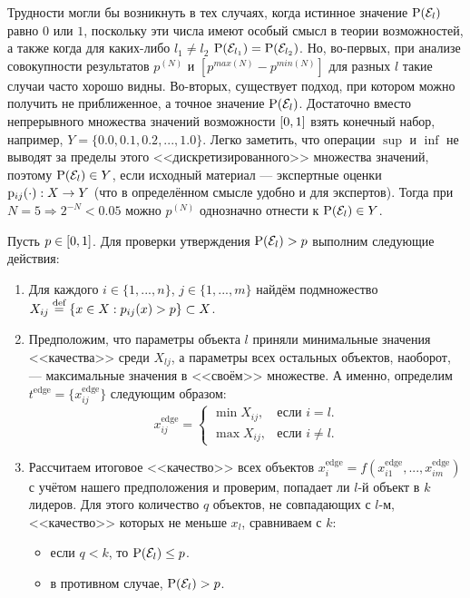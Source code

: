 Трудности могли бы возникнуть в тех случаях, когда истинное значение ${\mathrm{P}}(\mathcal{E}_l)$ равно $0$ или $1$, поскольку эти числа имеют особый смысл в теории возможностей, а также когда для каких-либо $l_1 \neq l_2$ ${\mathrm{P}}(\mathcal{E}_{l_1}) = {\mathrm{P}}(\mathcal{E}_{l_2})$. Но, во-первых, при анализе совокупности результатов $p^{(N)}$ и $[p^{max(N)} - p^{min(N)}]$ для разных $l$ такие случаи часто хорошо видны. Во-вторых, существует подход, при котором можно получить не приближенное, а точное значение ${\mathrm{P}}(\mathcal{E}_l)$. Достаточно вместо непрерывного множества значений возможности $[0,1]$ взять конечный набор, например, $Y = \{0.0, 0.1, 0.2, ..., 1.0\}$. Легко заметить, что операции $\sup$ и $\inf$ не выводят за пределы этого <<дискретизированного>> множества значений, поэтому ${\mathrm{P}}(\mathcal{E}_l) \in Y$, если исходный материал --- экспертные оценки ${\mathrm{p}}_{ij}(\cdot): X \rightarrow Y$ (что в определённом смысле удобно и для экспертов). Тогда при $N = 5 \Rightarrow 2^{-N} < 0.05$ можно $p^{(N)}$ однозначно отнести к ${\mathrm{P}}(\mathcal{E}_l) \in Y$.

Пусть $p \in [0,1]$. Для проверки утверждения ${\mathrm{P}}(\mathcal{E}_l) > p$ выполним следующие действия: 
\begin{enumerate}
  \item 
  Для каждого $i \in \{1, ..., n\}$, $j \in \{1, ..., m\}$ найдём подмножество $X_{ij} \overset{\text{def}}{=} \{x \in X: p_{ij}(x) > p\} \subset X$. 
  \item 
  Предположим, что параметры объекта $l$ приняли минимальные значения <<качества>> среди $X_{lj}$, а параметры всех остальных объектов, наоборот, --- максимальные значения в <<своём>> множестве. А именно, определим $t^\text{edge} = \{x_{ij}^\text{edge}\}$ следующим образом:
  \begin{equation*}
    x_{ij}^\text{edge} =
    \begin{cases}
      \min X_{ij}, &\text{если $i = l$.}\\
      \max X_{ij}, &\text{если $i \neq l$.} 
    \end{cases}
  \end{equation*}
  \item
  Рассчитаем итоговое <<качество>> всех объектов $x_i^\text{edge} = f(x_{i1}^\text{edge}, ..., x_{im}^\text{edge})$ с учётом нашего предположения и проверим, попадает ли $l$-й объект в $k$ лидеров. Для этого количество $q$ объектов, не совпадающих с $l$-м, <<качество>> которых не меньше $x_l$, сравниваем с $k$:
 	\begin{itemize}
		\item если $q < k$, то ${\mathrm{P}}(\mathcal{E}_l) \leq p$.
		\item в противном случае, ${\mathrm{P}}(\mathcal{E}_l) > p$.
	\end{itemize} 
\end{enumerate}  

